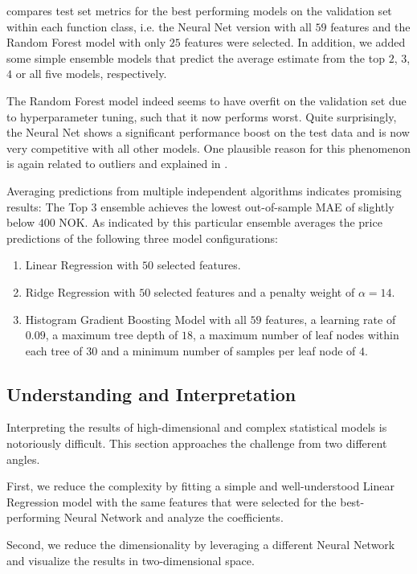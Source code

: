  compares test set metrics for the best performing models on the validation set within each function class, i.e. the Neural Net version with all $59$ features and the Random Forest model with only $25$ features were selected.
In addition, we added some simple ensemble models that predict the average estimate from the top $2$, $3$, $4$ or all five models, respectively.

The Random Forest model indeed seems to have overfit on the validation set due to hyperparameter tuning, such that it now performs worst.
Quite surprisingly, the Neural Net shows a significant performance boost on the test data and is now very competitive with all other models.
One plausible reason for this phenomenon is again related to outliers and explained in .

Averaging predictions from multiple independent algorithms indicates promising results:
The Top $3$ ensemble achieves the lowest out-of-sample MAE of slightly below $400$ NOK.
As indicated by  this particular ensemble averages the price predictions of the following three model configurations:
\begin{enumerate}
  \item Linear Regression with $50$ selected features.
  \item Ridge Regression with $50$ selected features and a penalty weight of $\alpha = 14$.
  \item Histogram Gradient Boosting Model with all $59$ features, a learning rate of $0.09$, a maximum tree depth of $18$, a maximum number of leaf nodes within each tree of $30$ and a minimum number of samples per leaf node of $4$.
\end{enumerate}




\subsection{Understanding and Interpretation}

Interpreting the results of high-dimensional and complex statistical models is notoriously difficult.
This section approaches the challenge from two different angles.

First, we reduce the complexity by fitting a simple and well-understood Linear Regression model with the same features that were selected for the best-performing Neural Network and analyze the coefficients.

Second, we reduce the dimensionality by leveraging a different Neural Network and visualize the results in two-dimensional space.


